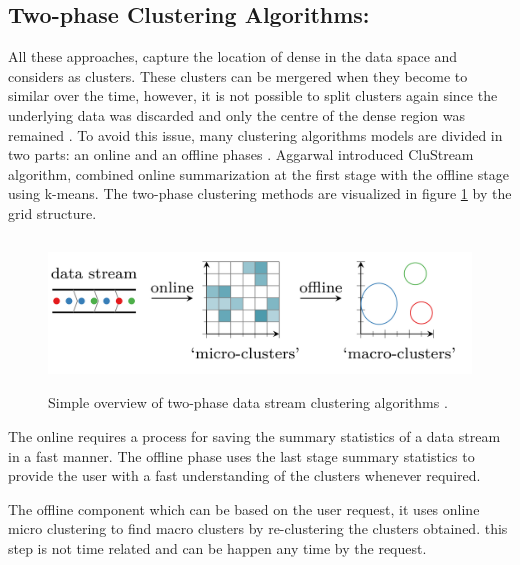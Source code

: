 \documentclass[../UNBThesis2.tex]{subfiles}
\begin{document}
\subsection{Two-phase Clustering Algorithms:}

All these approaches, capture the location of dense in the data space and considers as clusters. These clusters can be mergered when they become to similar over the time, however, it is not possible to split clusters again since the underlying data was discarded and only the centre of the dense region was remained \cite{aggarwal2007data}. To avoid this issue, many clustering algorithms models are divided in two parts: an online and an offline phases \cite{aggarwal2003framework}. Aggarwal introduced CluStream algorithm, combined online summarization at the first stage with the offline stage using k-means. The two-phase clustering methods are visualized in figure \ref{2phase} by the grid structure.

\begin{figure}
\centering
\includegraphics[width = 15cm,height = 4cm]{image/Chapters/Chapter2/2phase.png}
\caption{Simple overview of two-phase data stream clustering algorithms \protect\cite{carnein2019optimizing}.}
\label{2phase}
\end{figure}

The online requires a process for saving the summary statistics of a data stream in a fast manner. The offline phase uses the last stage summary statistics to provide the user with a fast understanding of the clusters whenever required. 

The offline component which can be based on the user request, it uses online micro clustering to find macro clusters by re-clustering the clusters obtained. this step is not time related and can be happen any time by the request. 


\end{document}
